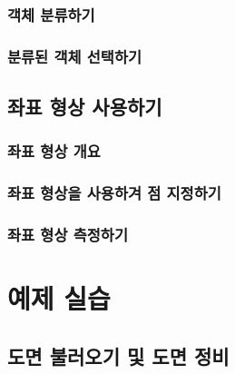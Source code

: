 \documentclass[12pt,a4paper,oneside]{book}
\begin{document}
	\section{객체 분류하기}
	
	
	\newpage
	\section{분류된 객체 선택하기}
	
	
			
\newpage
\chapter{좌표 형상 사용하기}



	\newpage
	\section{좌표 형상 개요}



	\newpage
	\section{좌표 형상을 사용하겨 점 지정하기}
	
	
	\newpage
	\section{좌표 형상 측정하기}
	



	\part{예제 실습}


\newpage
\chapter{도면 불러오기 및 도면 정비}


	\newpage
\end{document}
